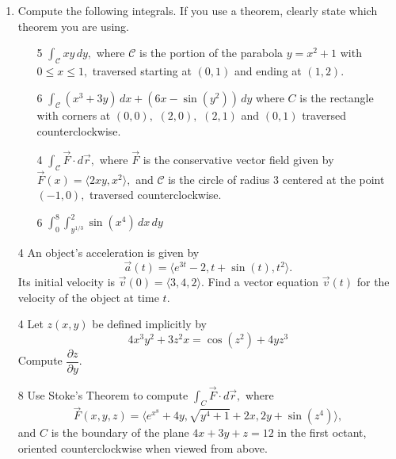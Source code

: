\documentclass[addpoints,12pt]{exam}
\begin{document}
\begin{enumerate}
\item Compute the following integrals. If you use a theorem, clearly state which theorem you
are using.
\begin{itemize}
\item[5] $\displaystyle\int_{\mathcal{C}} xy \, dy,$ where $\mathcal{C}$ is the portion of the
parabola $y = x^2+1$ with $0\le x \le 1,$ traversed starting at $(0,1)$ and ending at $(1,2).$
\vfill
\item[6] $\displaystyle\int_{\mathcal{C}}(x^3 +3y)\, dx + (6x - \sin(y^2))\, dy $ where $C$ is the
rectangle with corners at $(0,0),$ $(2,0),$ $(2,1)$ and $(0,1)$ traversed counterclockwise.
\vfill
\newpage
\item[4] $\displaystyle\int_{\mathcal{C}}
\vec{F} \cdot d\vec{r}, $ where $\vec{F}$ is the conservative vector field given by $\vec{F}(x) =
\langle 2xy, x^2 \rangle,$ and $\mathcal{C}$ is the circle of radius 3 centered at the point $(-1,
0), $ traversed counterclockwise.
\vfill
\vfill
\item[6] $\displaystyle\int_0^8 \int_{y^{1/3}}^2\sin(x^4)\, dx \, dy$
\vfill
\vfill
\vfill
\newpage
\end{itemize}
\newpage
\item[4] An object's acceleration is given by
$$\vec{a}(t) = \langle e^{3t}-2, t+\sin(t) , t^2 \rangle.$$
Its initial velocity is $\vec{v}(0) = \langle 3,4,2 \rangle.$ Find a vector equation $\vec{v}(t)$ for
the velocity of the object at time $t.$
\newpage
\item[4] Let $z(x,y)$ be defined implicitly by
$$ 4x^3y^2 +3z^2 x = \cos(z^2) + 4yz^3$$
Compute $\dfrac{\partial z}{\partial y}. $
\newpage
\item[8] Use Stoke's Theorem to compute
$\displaystyle\int_C \vec{F} \cdot d\vec{r},$
where
$$\vec{F}(x, y, z) = \langle e^{x^8}+4y, \sqrt{y^4+1} +2x, 2y + \sin(z^4) \rangle,$$
and \( C \) is the boundary of the plane $4x + 3y + z = 12 $ in the first octant, oriented
counterclockwise when viewed from above.

\end{enumerate}
\end{document}

